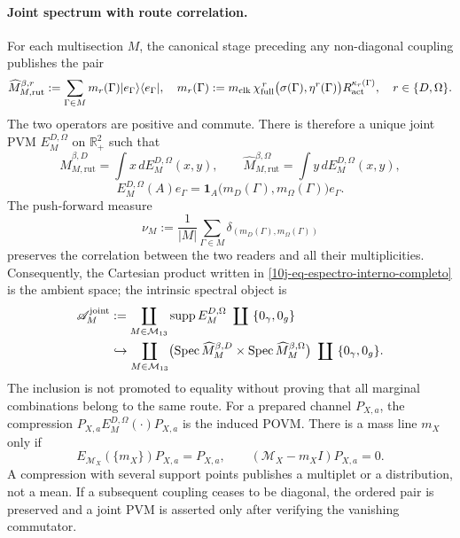 \paragraph{Joint spectrum with route correlation.}
For each multisection \(M\), the canonical stage preceding any non-diagonal coupling publishes the pair
\begin{equation}
 \widehat M_{M,\mathrm{rut}}^{\beta,r}
 :=\sum_{\Gamma\in M}m_r(\Gamma)
 |e_\Gamma\rangle\langle e_\Gamma|,
 \quad
 m_r(\Gamma):=m_{\rm clk}\,
 \chi_{\rm full}^{\,r}\bigl(\sigma(\Gamma),\eta^r(\Gamma)\bigr)
 R_{\rm act}^{\kappa_r(\Gamma)},
 \quad r\in\{D,\Omega\}.
 \label{10j-eq-par-diagonal-ruta}
\end{equation}
The two operators are positive and commute. There is therefore a unique joint PVM \(E_M^{D,\Omega}\) on \(\mathbb R_+^2\) such that
\begin{equation}
 \widehat M_{M,\mathrm{rut}}^{\beta,D}=\int x\,dE_M^{D,\Omega}(x,y),
 \qquad
 \widehat M_{M,\mathrm{rut}}^{\beta,\Omega}=\int y\,dE_M^{D,\Omega}(x,y),
 \label{10j-eq-pvm-conjunta}
\end{equation}
\begin{equation}
 E_M^{D,\Omega}(A)e_\Gamma
 =\mathbf 1_A\!\bigl(m_D(\Gamma),m_\Omega(\Gamma)\bigr)e_\Gamma.
 \label{10j-eq-pvm-accion-ruta}
\end{equation}
The push-forward measure
\begin{equation}
 \nu_M:=\frac1{|M|}\sum_{\Gamma\in M}
 \delta_{(m_D(\Gamma),m_\Omega(\Gamma))}
 \label{10j-eq-medida-imagen-conjunta}
\end{equation}
preserves the correlation between the two readers and all their multiplicities. Consequently, the Cartesian product written in \eqref{10j-eq-espectro-interno-completo} is the ambient space; the intrinsic spectral object is
\begin{equation}
 \begin{aligned}
 \mathscr A_M^{\rm joint}
 &:=
 \coprod_{M\in\mathcal M_{13}}\operatorname{supp}E_M^{D,\Omega}
 \ \coprod\ \{0_\gamma,0_g\}\\
 &\hookrightarrow
 \coprod_{M\in\mathcal M_{13}}
 \bigl(\operatorname{Spec}\widehat M_M^{\beta,D}
 \times\operatorname{Spec}\widehat M_M^{\beta,\Omega}\bigr)
 \ \coprod\ \{0_\gamma,0_g\}.
 \end{aligned}
 \label{10j-eq-espectro-conjunto-completo}
\end{equation}
The inclusion is not promoted to equality without proving that all marginal combinations belong to the same route. For a prepared channel \(P_{X,a}\), the compression \(P_{X,a}E_M^{D,\Omega}(\cdot)P_{X,a}\) is the induced POVM. There is a mass line \(m_X\) only if
\begin{equation}
 E_{\mathcal M_X}(\{m_X\})P_{X,a}=P_{X,a},
 \qquad
 (\mathcal M_X-m_XI)P_{X,a}=0.
 \label{10j-eq-criterio-linea-espectral}
\end{equation}
A compression with several support points publishes a multiplet or a distribution, not a mean. If a subsequent coupling ceases to be diagonal, the ordered pair is preserved and a joint PVM is asserted only after verifying the vanishing commutator.

